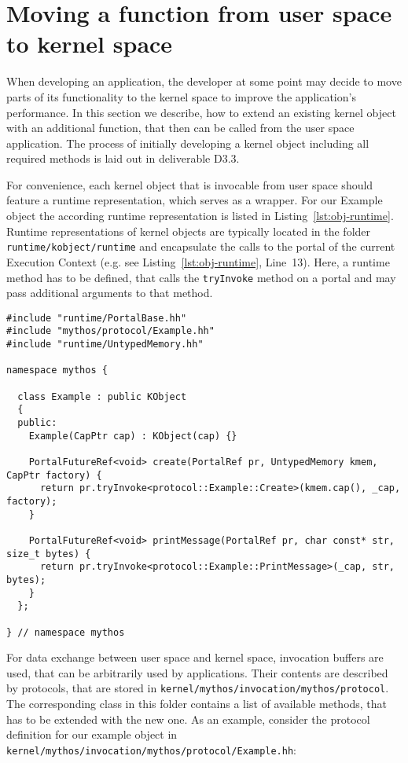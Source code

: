 \section{Moving a function from user space to kernel space}
\label{sec:objects}

When developing an application, the developer at some point may decide to move
parts of its functionality to the kernel space to improve the application's
performance. In this section we describe, how to extend an existing kernel
object with an additional function, that then can be called from the user space
application. The process of initially developing a kernel object including all
required methods is laid out in deliverable D3.3.

For convenience, each kernel object that is invocable from user space should
feature a runtime representation, which serves as a wrapper.  For our Example
object the according runtime representation is listed in
Listing~\ref{lst:obj-runtime}. Runtime representations of kernel objects are
typically located in the folder \texttt{runtime/kobject/runtime} and
encapsulate the calls to the portal of the current Execution Context (e.g. see
Listing~\ref{lst:obj-runtime}, Line~13). Here, a runtime method has to be
defined, that calls the \texttt{tryInvoke} method on a portal and may pass
additional arguments to that method.

\lstset{language=c++,caption=Object's Runtime Representation,label=lst:obj-runtime}
\begin{lstlisting}
#include "runtime/PortalBase.hh"
#include "mythos/protocol/Example.hh"
#include "runtime/UntypedMemory.hh"

namespace mythos {

  class Example : public KObject
  {
  public:
    Example(CapPtr cap) : KObject(cap) {}

    PortalFutureRef<void> create(PortalRef pr, UntypedMemory kmem, CapPtr factory) {
      return pr.tryInvoke<protocol::Example::Create>(kmem.cap(), _cap, factory);
    }

    PortalFutureRef<void> printMessage(PortalRef pr, char const* str, size_t bytes) {
      return pr.tryInvoke<protocol::Example::PrintMessage>(_cap, str, bytes);
    }
  };

} // namespace mythos
\end{lstlisting}

For data exchange between user space and kernel space, invocation buffers are
used, that can be arbitrarily used by applications. Their contents are
described by protocols, that are stored in
\texttt{kernel/mythos/invocation/mythos/protocol}. The corresponding class in
this folder contains a list of available methods, that has to be extended with
the new one. As an example, consider the protocol definition for our example object in
\texttt{kernel/mythos/invocation/mythos/protocol/Example.hh}: 

